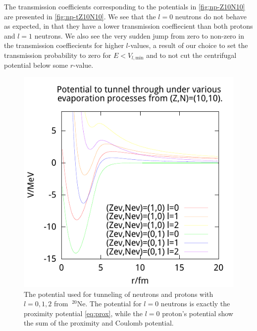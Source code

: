 The transmission coefficients corresponding to the potentials in \autoref{fig:np-Z10N10} are presented in \autoref{fig:np-tZ10N10}.  We see that the $l=0$ neutrons do not behave as expected, in that they have a lower transmission coeffiecient than both protons and $l=1$ neutrons. We also see the very sudden jump from zero to non-zero in the transmission coeffiecients for higher $l$-values, a result of our choice to set the transmission probability to zero for $E<V_{l,\text{min}}$ and to not cut the centrifugal potential below some $r$-value.
\begin{figure}
\begin{center}
\includegraphics{figures/pot/np-potZ10N10.pdf}
\caption{\label{fig:np-Z10N10} The potential used for tunneling of neutrons and protons with $l=0,1,2$ from $~^{20}\mathrm{Ne}$. The potential for $l=0$ neutrons is exactly the proximity potential \eqref{eq:prox}, while the $l=0$ proton's potential show the sum of the proximity and Coulomb potential. }
\end{center}
\end{figure}

